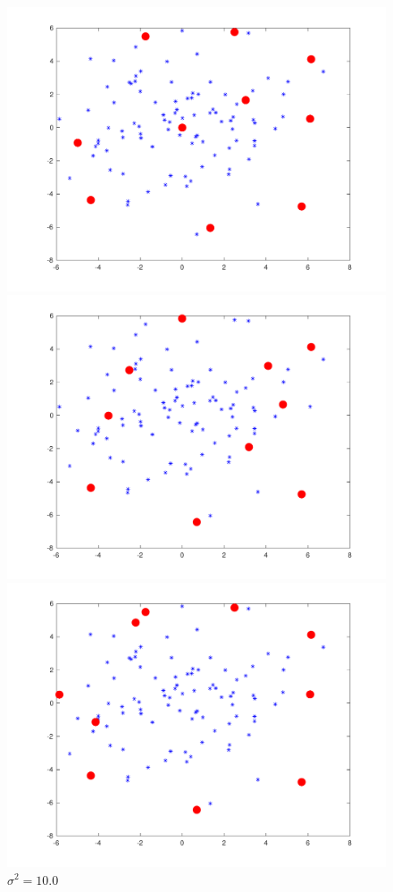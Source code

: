\begin{figure}
\begin{minipage}{\linewidth}
\includegraphics[width=\linewidth]{../src/figures/fixedsize/fixedsize_100}
    \caption*{$\sigma^2=1.0$}
\includegraphics[width=\linewidth]{../src/figures/fixedsize/fixedsize_1000}
    \caption*{$\sigma^2=10.0$}
\includegraphics[width=\linewidth]{../src/figures/fixedsize/fixedsize_10000}

\end{minipage}
\end{figure}
